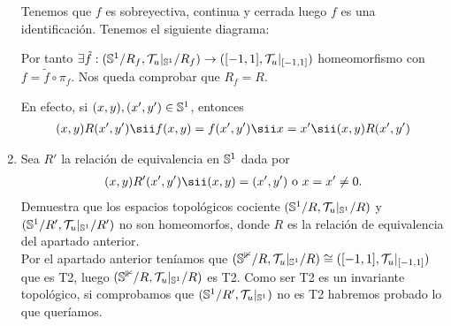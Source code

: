\documentclass[12pt]{article}
\begin{document}
\begin{ejercicio}[4 puntos]
\begin{enumerate}
            Tenemos que $f$ es sobreyectiva, continua y cerrada luego $f$ es una identificación. Tenemos el siguiente diagrama:

            \begin{figure}[H]
                \centering
            \end{figure}
            Por tanto $\exists \tilde{f}:(\mathbb{S}^1/R_f, \mathcal{T}_u|_{\mathbb{S}^1}/R_f)\to ([-1,1], \mathcal{T}_u|_{[-1,1]})$ homeomorfismo con $f=\tilde{f}\circ \pi_f$. Nos queda comprobar que $R_f=R$.

            En efecto, si $(x,y),(x',y')\in \mathbb{S}^1$, entonces 
            \begin{align*}
                (x,y)R(x',y') \sii f(x,y)=f(x',y') \sii x=x' \sii (x,y)R(x',y')
            \end{align*}

            \item Sea $R'$ la relación de equivalencia en $\mathbb{S}^1$ dada por
            \begin{align*}
                (x,y)R'(x',y')\sii (x,y)=(x',y') \text{ o } x=x'\neq 0.
            \end{align*}
            Demuestra que los espacios topológicos cociente $(\mathbb{S}^1/R, \mathcal{T}_u|_{\mathbb{S}^1}/R)$ y $(\mathbb{S}^1/R', \mathcal{T}_u|_{\mathbb{S}^1}/R')$ no son homeomorfos, donde $R$ es la relación de equivalencia del apartado anterior.\\

            Por el apartado anterior teníamos que $(\mathbb{S^1}/R, \mathcal{T}_u|_{\mathbb{S}^1}/R)\cong ([-1,1], \mathcal{T}_u|_{[-1,1]})$ que es T2, luego $(\mathbb{S^1}/R, \mathcal{T}_u|_{\mathbb{S}^1}/R)$ es T2. Como ser T2 es un invariante topológico, si comprobamos que $(\mathbb{S}^1/R', \mathcal{T}_u|_{\mathbb{S}^1})$ no es T2 habremos probado lo que queríamos.


\end{enumerate}
\end{ejercicio}
\end{document}
